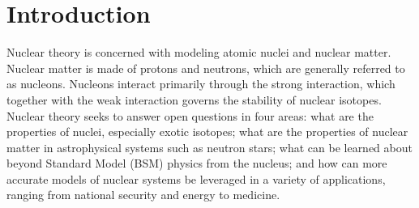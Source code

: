 \chapter{Introduction}\label{introduction}



Nuclear theory is concerned with modeling atomic nuclei and nuclear matter. Nuclear matter is made of protons and neutrons, which are generally referred to as nucleons. Nucleons interact primarily through the strong interaction, which together with the weak interaction governs the stability of nuclear isotopes. Nuclear theory seeks to answer open questions in four areas: what are the properties of nuclei, especially exotic isotopes; what are the properties of nuclear matter in astrophysical systems such as neutron stars; what can be learned about beyond Standard Model (BSM) physics from the nucleus; and how can more accurate models of nuclear systems be leveraged in a variety of applications, ranging from national security and energy to medicine.

